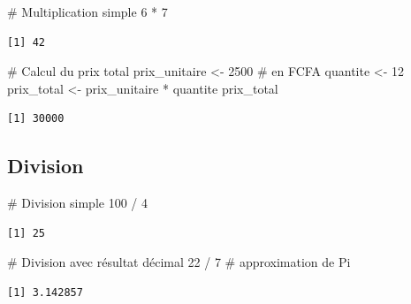 \documentclass[
  french,
  11pt,
  a4paper,
]{article}
\newenvironment{Shaded}{}{}
\newcommand{\CommentTok}[1]{\textcolor[rgb]{0.42,0.45,0.49}{#1}}
\newcommand{\DecValTok}[1]{\textcolor[rgb]{0.00,0.36,0.77}{#1}}
\newcommand{\NormalTok}[1]{\textcolor[rgb]{0.14,0.16,0.18}{#1}}
\newcommand{\OtherTok}[1]{\textcolor[rgb]{0.44,0.26,0.76}{#1}}
\newcommand{\SpecialCharTok}[1]{\textcolor[rgb]{0.00,0.36,0.77}{#1}}
\begin{document}
\begin{Shaded}
\begin{Highlighting}[]
\CommentTok{\# Multiplication simple}
\DecValTok{6} \SpecialCharTok{*} \DecValTok{7}
\end{Highlighting}
\end{Shaded}

\begin{verbatim}
[1] 42
\end{verbatim}

\begin{Shaded}
\begin{Highlighting}[]
\CommentTok{\# Calcul du prix total}
\NormalTok{prix\_unitaire }\OtherTok{\textless{}{-}} \DecValTok{2500}  \CommentTok{\# en FCFA}
\NormalTok{quantite }\OtherTok{\textless{}{-}} \DecValTok{12}
\NormalTok{prix\_total }\OtherTok{\textless{}{-}}\NormalTok{ prix\_unitaire }\SpecialCharTok{*}\NormalTok{ quantite}
\NormalTok{prix\_total}
\end{Highlighting}
\end{Shaded}

\begin{verbatim}
[1] 30000
\end{verbatim}

\subsection{Division}\label{division}

\begin{Shaded}
\begin{Highlighting}[]
\CommentTok{\# Division simple}
\DecValTok{100} \SpecialCharTok{/} \DecValTok{4}
\end{Highlighting}
\end{Shaded}

\begin{verbatim}
[1] 25
\end{verbatim}

\begin{Shaded}
\begin{Highlighting}[]
\CommentTok{\# Division avec résultat décimal}
\DecValTok{22} \SpecialCharTok{/} \DecValTok{7}  \CommentTok{\# approximation de Pi}
\end{Highlighting}
\end{Shaded}

\begin{verbatim}
[1] 3.142857
\end{verbatim}
\end{document}
